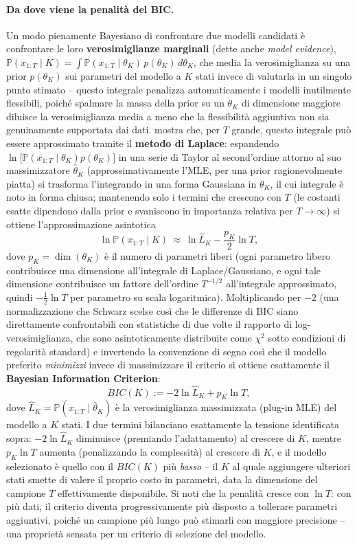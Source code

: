 \documentclass[11pt]{article}
\theoremstyle{definition}
\theoremstyle{remark}
\begin{document}
\paragraph{Da dove viene la penalit\`a del BIC.} Un modo pienamente Bayesiano di confrontare due modelli candidati \`e confrontare le loro \textbf{verosimiglianze marginali} (dette anche \emph{model evidence}), $\mathbb{P}(x_{1:T}\mid K)=\int \mathbb{P}(x_{1:T}\mid\theta_K)\,p(\theta_K)\,d\theta_K$, che media la verosimiglianza su una prior $p(\theta_K)$ sui parametri del modello a $K$ stati invece di valutarla in un singolo punto stimato -- questo integrale penalizza automaticamente i modelli inutilmente flessibili, poich\'e spalmare la massa della prior su un $\theta_K$ di dimensione maggiore diluisce la verosimiglianza media a meno che la flessibilit\`a aggiuntiva non sia genuinamente supportata dai dati. \cite{schwarz1978} mostra che, per $T$ grande, questo integrale pu\`o essere approssimato tramite il \textbf{metodo di Laplace}: espandendo $\ln\big[\mathbb{P}(x_{1:T}\mid\theta_K)p(\theta_K)\big]$ in una serie di Taylor al second'ordine attorno al suo massimizzatore $\widehat\theta_K$ (approssimativamente l'MLE, per una prior ragionevolmente piatta) si trasforma l'integrando in una forma Gaussiana in $\theta_K$, il cui integrale \`e noto in forma chiusa; mantenendo solo i termini che crescono con $T$ (le costanti esatte dipendono dalla prior e svaniscono in importanza relativa per $T\to\infty$) si ottiene l'approssimazione asintotica
\[
\ln\mathbb{P}(x_{1:T}\mid K) \ \approx\ \ln\widehat{L}_K - \frac{p_K}{2}\ln T,
\]
dove $p_K=\dim(\theta_K)$ \`e il numero di parametri liberi (ogni parametro libero contribuisce una dimensione all'integrale di Laplace/Gaussiano, e ogni tale dimensione contribuisce un fattore dell'ordine $T^{-1/2}$ all'integrale approssimato, quindi $-\tfrac12\ln T$ per parametro su scala logaritmica). Moltiplicando per $-2$ (una normalizzazione che Schwarz scelse cos\`i che le differenze di BIC siano direttamente confrontabili con statistiche di due volte il rapporto di log-verosimiglianza, che sono asintoticamente distribuite come $\chi^2$ sotto condizioni di regolarit\`a standard) e invertendo la convenzione di segno cos\`i che il modello preferito \emph{minimizzi} invece di massimizzare il criterio si ottiene esattamente il \textbf{Bayesian Information Criterion}:
\[
BIC(K) := -2\ln\widehat{L}_K + p_K\ln T,
\]
dove $\widehat L_K=\mathbb{P}(x_{1:T}\mid\widehat\theta_K)$ \`e la verosimiglianza massimizzata (plug-in MLE) del modello a $K$ stati. I due termini bilanciano esattamente la tensione identificata sopra: $-2\ln\widehat L_K$ diminuisce (premiando l'adattamento) al crescere di $K$, mentre $p_K\ln T$ aumenta (penalizzando la complessit\`a) al crescere di $K$, e il modello selezionato \`e quello con il $BIC(K)$ pi\`u \emph{basso} -- il $K$ al quale aggiungere ulteriori stati smette di valere il proprio costo in parametri, data la dimensione del campione $T$ effettivamente disponibile. Si noti che la penalit\`a cresce con $\ln T$: con pi\`u dati, il criterio diventa progressivamente pi\`u disposto a tollerare parametri aggiuntivi, poich\'e un campione pi\`u lungo pu\`o stimarli con maggiore precisione -- una propriet\`a sensata per un criterio di selezione del modello.
\end{document}

